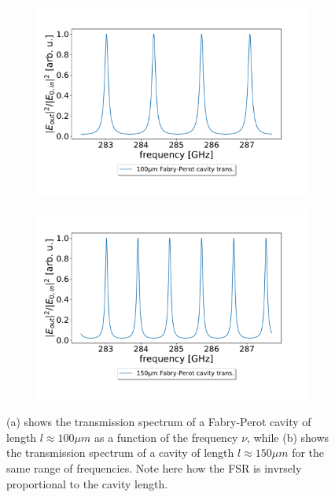 \begin{figure}[h!]
    \centering
    \begin{subfigure}[b]{0.49\textwidth}
        \includegraphics[width=\textwidth]{figures/100um_fabry_perot_trans_vs_freq.pdf}
        \caption{}
    \end{subfigure}
    \begin{subfigure}[b]{0.49\textwidth}
        \includegraphics[width=\textwidth]{figures/150um_fabry_perot_trans_vs_freq.pdf}
        \caption{}
    \end{subfigure}
    \caption{(a) shows the transmission spectrum of a Fabry-Perot cavity of length $l \approx 100 \mu m$ as a function of the frequency $\nu$, while (b) shows the transmission spectrum of a cavity of length $l \approx 150 \mu m$ for the same range of frequencies. Note here how the FSR is invrsely proportional to the cavity length.}
    \label{fig:fabry_perot_FSR_comparison}
\end{figure}

